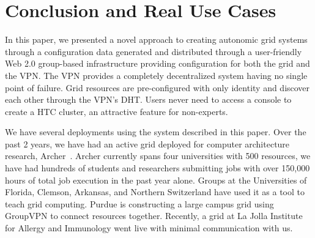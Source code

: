 \documentclass{sig-alternate}
\begin{document}
\section{Conclusion and Real Use Cases}
\label{conclusion}
In this paper, we presented a novel approach to creating autonomic grid systems
through a configuration data generated and distributed through a user-friendly
Web 2.0 group-based infrastructure providing configuration for both the grid
and the VPN.  The VPN provides a completely decentralized system having no
single point of failure.  Grid resources are pre-configured with only identity
and discover each other through the VPN's DHT.  Users never need to access a
console to create a HTC cluster, an attractive feature for non-experts.

We have several deployments using the system described in this paper.  Over
the past 2 years, we have had an active grid deployed for computer architecture
research, Archer~\cite{archer}.  Archer currently spans four universities with
500 resources, we have had hundreds of students and researchers submitting jobs
with over 150,000 hours of total job execution in the past year alone.  Groups
at the Universities of Florida, Clemson, Arkansas, and Northern Switzerland have
used it as a tool to teach grid computing.  Purdue is constructing a large
campus grid using GroupVPN to connect resources together.  Recently, a grid at
La Jolla Institute for Allergy and Immunology went live with minimal
communication with us.


\small{

\suppressfloats
}
\end{document}

